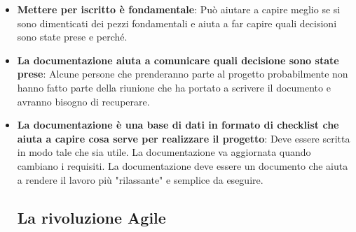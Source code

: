 \begin{itemize}
	\item \textbf{Mettere per iscritto è fondamentale}: Può aiutare a capire meglio se si sono dimenticati dei pezzi fondamentali e aiuta a far capire quali decisioni sono state prese e perché.
	\item \textbf{La documentazione aiuta a comunicare quali decisione sono state prese}: Alcune persone che prenderanno parte al progetto probabilmente non hanno fatto parte della riunione che ha portato a scrivere il documento e avranno bisogno di recuperare.
	\item \textbf{La documentazione è una base di dati in formato di checklist che aiuta a capire cosa serve per realizzare il progetto}: Deve essere scritta in modo tale che sia utile. La documentazione va aggiornata quando cambiano i requisiti. La documentazione deve essere un documento che aiuta a rendere il lavoro più "rilassante" e semplice da eseguire.
	\subsection{La rivoluzione Agile}

\end{itemize}
